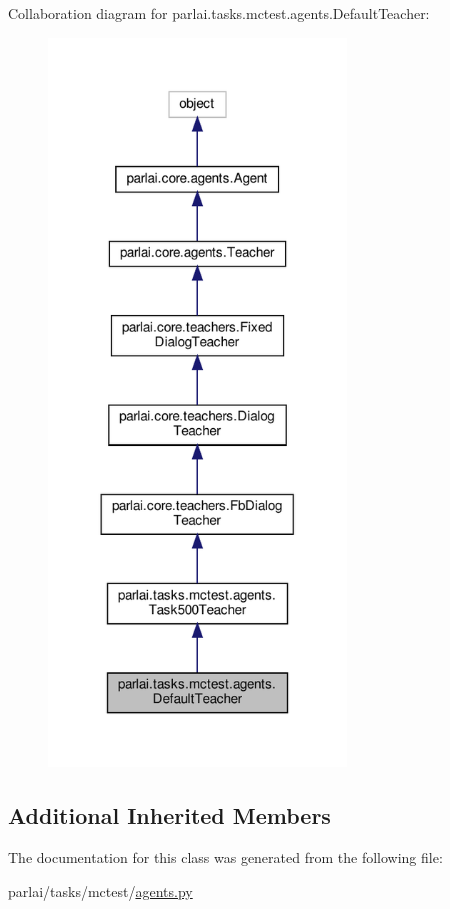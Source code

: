 Collaboration diagram for parlai.\+tasks.\+mctest.\+agents.\+Default\+Teacher\+:
\nopagebreak
\begin{figure}[H]
\begin{center}
\leavevmode
\includegraphics[width=224pt]{classparlai_1_1tasks_1_1mctest_1_1agents_1_1DefaultTeacher__coll__graph}
\end{center}
\end{figure}
\subsection*{Additional Inherited Members}


The documentation for this class was generated from the following file\+:\begin{DoxyCompactItemize}
\item 
parlai/tasks/mctest/\hyperlink{parlai_2tasks_2mctest_2agents_8py}{agents.\+py}\end{DoxyCompactItemize}
